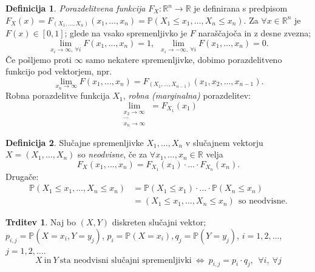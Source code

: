 \documentclass[11pt]{article}
\theoremstyle{definition}
\newtheorem{definicija}{Definicija}[section]
\theoremstyle{definition}
\newtheorem{trditev}{Trditev}[section]
\theoremstyle{definition}
\begin{document}
\begin{definicija}

\textit{Porazdelitvena funkcija} $F_X: \mathbb{R}^n \rightarrow \mathbb{R}$ je definirana s predpisom $F_X(x) = F_{(X_1, \ldots, X_n)}(x_1, \ldots, x_n) = \mathbb{P}(X_1 \leq x_1, \ldots, X_n \leq x_n)$. Za $\forall x \in \mathbb{R}^n$ je $F(x) \in [0, 1]$; glede na vsako spremenljivko je $F$ naraščajoča in z desne zvezna;
$$\lim_{x_i \rightarrow \infty, ~\forall i} F(x_1, \ldots, x_n) = 1, ~~\lim_{x_i \rightarrow -\infty, ~\forall i} F(x_1, \ldots, x_n) = 0.$$
Če pošljemo proti $\infty$ samo nekatere spremenljivke, dobimo porazdelitveno funkcijo pod vektorjem, npr.
$$\lim_{x_n \rightarrow \infty} F(x_1, \ldots, x_n) = F_{(X_1, \ldots, X_{n-1})}(x_1, x_2, \ldots, x_{n-1}).$$
Robna porazdelitve funkcija $X_1$, \textit{robna (marginalna)} porazdelitev:
$$\lim_{\substack{x_2 \rightarrow \infty \\ \cdots \\ x_n \rightarrow \infty}} = F_{X_1}(x_1)$$

\end{definicija}
\vspace{0.5cm}

\begin{definicija}

Slučajne spremenljivke $X_1, \ldots, X_n$ v slučajnem vektorju $X = (X_1, \ldots, X_n)$ so \textit{neodvisne}, če za $\forall x_1, \ldots, x_n \in \mathbb{R}$ velja 
$$F_X(x_1, \ldots, x_n) = F_{X_1}(x_1) \cdot \ldots \cdot F_{X_n}(x_n).$$
Drugače:
\begin{align*}
\mathbb{P}(X_1 \leq x_1, \ldots, X_n \leq x_n) &= \mathbb{P}(X_1 \leq x_1) \cdot \ldots \cdot \mathbb{P}(X_n \leq x_n) \\ 
&= (X_1 \leq x_1, \ldots, X_n \leq x_n) ~~\text{so neodvisne}.
\end{align*}

\end{definicija}
\vspace{0.5cm}

\begin{trditev}

Naj bo $(X, Y)$ diskreten slučajni vektor; \\$p_{i,j} = \mathbb{P}(X = x_i, Y = y_j)$, $p_i = \mathbb{P}(X = x_i), q_j = \mathbb{P}(Y = y_j)$, $i = 1, 2, \ldots$, $j = 1, 2, \ldots$.
$$X ~\text{in}~ Y ~\text{sta neodvisni slučajni spremenljivki}~ \Leftrightarrow ~p_{i,j} = p_i \cdot q_j, ~~\forall i, ~\forall j $$

\end{trditev}
\vspace{0.5cm}

\end{document}
